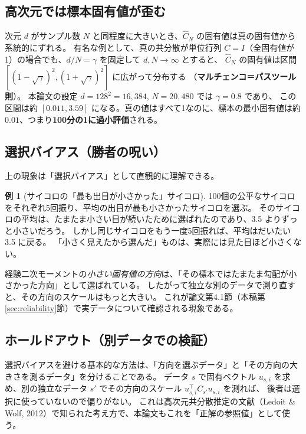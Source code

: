 \documentclass[a4paper,11pt]{ltjsarticle}
\theoremstyle{definition}
\newtheorem{example}[definition]{例}
\theoremstyle{plain}
\newcommand{\T}{^{\top}}
\begin{document}
\subsection{高次元では標本固有値が歪む}

次元 $d$ がサンプル数 $N$ と同程度に大きいとき、$\widehat C_N$ の固有値は真の固有値から系統的にずれる。
有名な例として、真の共分散が単位行列 $C=I$（全固有値が1）の場合でも、$d/N = \gamma$ を固定して $d, N\to\infty$ とすると、
$\widehat C_N$ の固有値は区間 $[(1-\sqrt\gamma)^2, (1+\sqrt\gamma)^2]$ に広がって分布する
（\textbf{マルチェンコ＝パスツール則}）。
本論文の設定 $d = 128^2 = 16{,}384$, $N = 20{,}480$ では $\gamma = 0.8$ であり、
この区間は約 $[0.011, 3.59]$ になる。真の値はすべて1なのに、標本の最小固有値は約 $0.01$、つまり\textbf{100分の1に過小評価}される。

\subsection{選択バイアス（勝者の呪い）}

上の現象は「選択バイアス」として直観的に理解できる。

\begin{example}[サイコロの「最も出目が小さかった」サイコロ]
100個の公平なサイコロをそれぞれ5回振り、平均の出目が最も小さかったサイコロを選ぶ。
そのサイコロの平均は、たまたま小さい目が続いたために選ばれたのであり、3.5 よりずっと小さいだろう。
しかし同じサイコロをもう一度5回振れば、平均はだいたい 3.5 に戻る。
「小さく見えたから選んだ」ものは、実際には見た目ほど小さくない。
\end{example}

経験二次モーメントの\emph{小さい固有値の方向}は、「その標本ではたまたま勾配が小さかった方向」として選ばれている。
したがって独立な別のデータで測り直すと、その方向のスケールはもっと大きい。
これが論文第4.1節（本稿第\ref{sec:reliability}節）で実データについて確認される現象である。

\subsection{ホールドアウト（別データでの検証）}

選択バイアスを避ける基本的な方法は、「方向を選ぶデータ」と「その方向の大きさを測るデータ」を分けることである。
データ $s$ で固有ベクトル $u_{s,i}$ を求め、別の独立なデータ $s'$ でその方向のスケール $u_{s,i}\T C_{s'} u_{s,i}$ を測れば、
後者は選択に使っていないので偏りがない。
これは高次元共分散推定の文献（Ledoit \& Wolf, 2012）で知られた考え方で、本論文もこれを「正解の参照値」として使う。
\end{document}
